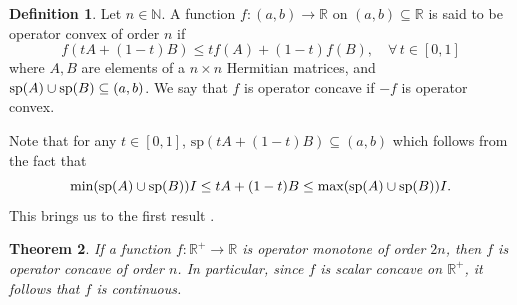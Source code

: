 \documentclass[12pt,a4paper]{amsart}
\newtheorem{theorem}{Theorem}
\theoremstyle{definition}
\newtheorem{definition}[theorem]{Definition}
\begin{document}
	\begin{definition}
		Let $n \in \mathbb{N}$. A function $f: (a,b) \rightarrow \mathbb{R}$ on $(a, b) \subseteq \mathbb{R}$ is said to be operator convex of order $n$ if
		\[ f(tA + (1-t)B) \leq t f(A) + (1-t)f(B), \quad \forall \, t \in [0,1]\]
		where $A, B$ are elements of a $n \times n$ Hermitian matrices,  and $\textnormal{sp}(A) \cup \textnormal{sp}(B) \subseteq (a,b)$. We say that $f$ is operator concave if $-f$ is operator convex.
	\end{definition}
	Note that for any $t \in [0,1]$, $\text{sp}(tA + (1-t)B) \subseteq (a,b)$ which follows from the fact that \[ \textnormal{min}(\textnormal{sp}(A) \cup \textnormal{sp}(B))I \leq tA + (1-t)B \leq \textnormal{max}(\textnormal{sp}(A) \cup \textnormal{sp}(B))I.  \]
	This brings us to the first result \cite[Theorem 2.1]{hansen-fasttrack}.
	\begin{theorem}\label{operator-monotone-implies-operator-concave}
		If a function $f: \mathbb{R}^{+} \rightarrow \mathbb{R}$  is operator monotone of order $2n$, then $f$ is operator concave of order $n$. In particular, since $f$ is scalar concave on $\mathbb{R}^{+}$, it follows that $f$ is continuous.
	\end{theorem}
\end{document}
